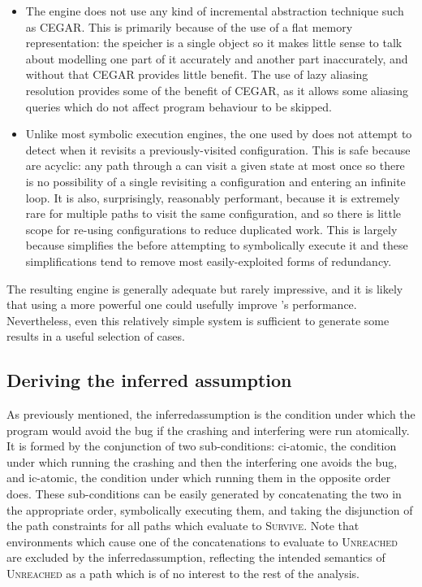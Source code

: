 \begin{itemize}
\item The engine does not use any kind of incremental abstraction
  technique such as CEGAR\cite{Clarke2000}.  This is primarily because
  of the use of a flat memory representation: the speicher is a single
  object so it makes little sense to talk about modelling one part of
  it accurately and another part inaccurately, and without that CEGAR
  provides little benefit.  The use of lazy aliasing resolution
  provides some of the benefit of CEGAR, as it allows some aliasing
  queries which do not affect program behaviour to be skipped.

\item Unlike most symbolic execution engines, the one used by
  {\implementation} does not attempt to detect when it revisits a
  previously-visited configuration.  This is safe because
  {\StateMachines} are acyclic: any path through a {\StateMachine} can
  visit a given state at most once so there is no possibility of a
  single revisiting a configuration and entering an infinite loop.  It
  is also, surprisingly, reasonably performant, because it is
  extremely rare for multiple paths to visit the same configuration,
  and so there is little scope for re-using configurations to reduce
  duplicated work.  This is largely because {\technique} simplifies
  the {\StateMachine} before attempting to symbolically execute it and
  these simplifications tend to remove most easily-exploited forms of
  redundancy.
\end{itemize}
The resulting engine is generally adequate but rarely impressive, and
it is likely that using a more powerful one could usefully improve
{\implementation}'s performance.  Nevertheless, even this relatively
simple system is sufficient to generate some results in a useful
selection of cases.

\subsection{Deriving the inferred assumption}
\label{sect:derive:inferred_assumption}

As previously mentioned, the \gls{inferredassumption} is the condition
under which the program would avoid the bug if the crashing and
interfering {\StateMachines} were run atomically.  It is formed by the
conjunction of two sub-conditions: \gls{ci-atomic}, the condition
under which running the crashing {\StateMachine} and then the
interfering one avoids the bug, and \gls{ic-atomic}, the condition
under which running them in the opposite order does.  These
sub-conditions can be easily generated by concatenating the two
{\StateMachines} in the appropriate order, symbolically executing
them, and taking the disjunction of the path constraints for all paths
which evaluate to \textsc{Survive}.  Note that {\StateMachine}
environments which cause one of the concatenations to evaluate to
\textsc{Unreached} are excluded by the \gls{inferredassumption},
reflecting the intended semantics of \textsc{Unreached} as a path
which is of no interest to the rest of the analysis.

